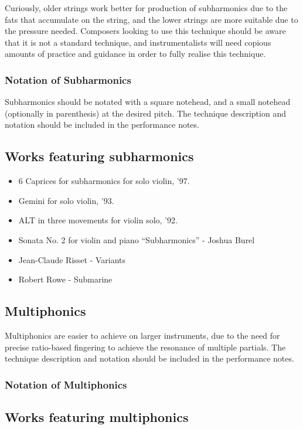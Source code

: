     Curiously, older strings work better for production of subharmonics due to the fats that accumulate on the string, and the lower strings are more suitable due to the pressure needed.\autocite{kimuraHowProduceSubharmonics1999}
Composers looking to use this technique should be aware that it is not a standard technique, and instrumentalists will need copious amounts of practice and guidance in order to fully realise this technique.

\subsubsection{Notation of Subharmonics}
Subharmonics should be notated with a square notehead, and a small notehead (optionally in parenthesis) at the desired pitch.
The technique description and notation should be included in the performance notes.

\subsection{Works featuring subharmonics}

\begin{itemize}
    \item 6 Caprices for subharmonics for solo violin, '97.
    \item Gemini for solo violin, '93.
    \item ALT in three movements for violin solo, '92.
    \item Sonata No. 2 for violin and piano “Subharmonics” - Joshua Burel
    \item Jean-Claude Risset - Variants
    \item Robert Rowe - Submarine
\end{itemize}

\subsection{Multiphonics}
Multiphonics are easier to achieve on larger instruments, due to the need for precise ratio-based fingering to achieve the resonance of multiple partials.
The technique description and notation should be included in the performance notes.
\lipsum[4]

\subsubsection{Notation of Multiphonics}

\subsection{Works featuring multiphonics}

